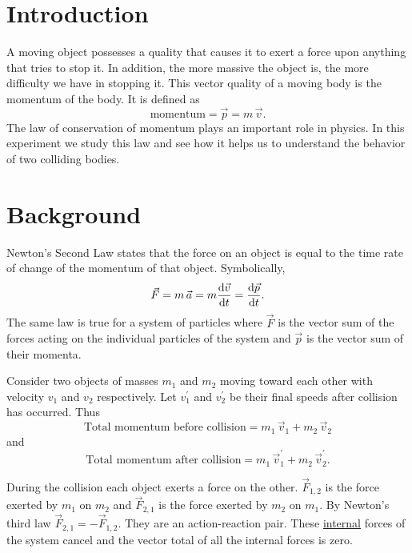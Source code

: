 
\label{lab:M7}

\section{Introduction}

A moving object possesses a quality that causes it to exert a force upon anything that tries to stop it.  In addition, the more massive the object is, the more difficulty we have in stopping it.  This vector quality of a moving body is the momentum of the body.  It is defined as
\[
\mbox{momentum} = \vec{p} = m \,\vec{v}.
\]
The law of conservation of momentum plays an important role in physics.  In this experiment we study this law and see how it helps us to understand the behavior of two colliding bodies.


\section{Background}

Newton's Second Law states that the force on an object is equal to the time rate of change of the momentum of that object.  Symbolically,
\begin{equation}
  \label{eq:M07Feqdpdt}
  \vec{F} = m \,\vec{a} = m \frac{{\rm d}\vec{v}}{{\rm d}t} = \frac{{\rm d}\vec{p}}{{\rm d}t}.
\end{equation}
The same law is true for a system of particles where $\vec{F}$ is the vector sum of the forces acting on the individual particles of the system and $\vec{p}$ is the vector sum of their momenta.

Consider two objects of masses $m_1$ and $m_2$ moving toward each other with velocity $v_1$ and $v_2$ respectively.  Let $v_1^\prime$ and $v_2^\prime$ be their final speeds after collision has occurred.
Thus
\[
\mbox{Total momentum before collision} = m_1 \,\vec{v}_1 + m_2 \,\vec{v}_2
\]
and
\[
\mbox{Total momentum after collision} =
m_1 \,\vec{v}_1^\prime + m_2 \,\vec{v}_2^\prime.
\]

During the collision each object exerts a force on the other.  $\vec{F}_{1,2}$ is the force exerted by $m_1$ on $m_2$ and $\vec{F}_{2,1}$ is the force exerted by $m_2$ on $m_1$.  By Newton's third law $\vec{F}_{2,1} = - \vec{F}_{1,2}$.  They are an action-reaction pair.  These \underline{internal} forces of the system cancel and the vector total of all the internal forces is zero.

